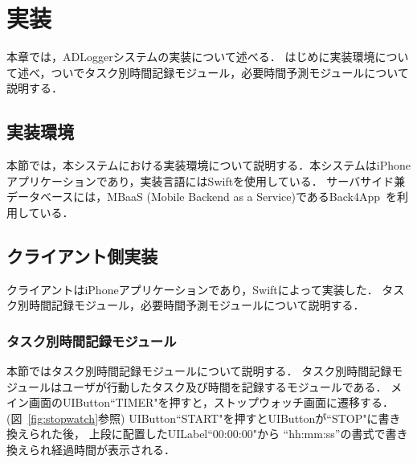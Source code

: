 \chapter{実装}
本章では，ADLoggerシステムの実装について述べる．
はじめに実装環境について述べ，ついでタスク別時間記録モジュール，必要時間予測モジュールについて説明する．

\section{実装環境}
本節では，本システムにおける実装環境について説明する．本システムはiPhoneアプリケーションであり，実装言語にはSwiftを使用している．
サーバサイド兼データベースには，MBaaS (Mobile Backend as a Service)であるBack4App~\cite{back4app}を利用している．

\section{クライアント側実装}
クライアントはiPhoneアプリケーションであり，Swiftによって実装した．
タスク別時間記録モジュール，必要時間予測モジュールについて説明する．

\subsection{タスク別時間記録モジュール}
本節ではタスク別時間記録モジュールについて説明する．
タスク別時間記録モジュールはユーザが行動したタスク及び時間を記録するモジュールである．
メイン画面のUIButton``TIMER"を押すと，ストップウォッチ画面に遷移する．(図~\ref{fig:stopwatch}参照)
UIButton``START"を押すとUIButtonが``STOP"に書き換えられた後，
上段に配置したUILabel``00:00:00"から “hh:mm:ss”の書式で書き換えられ経過時間が表示される．

